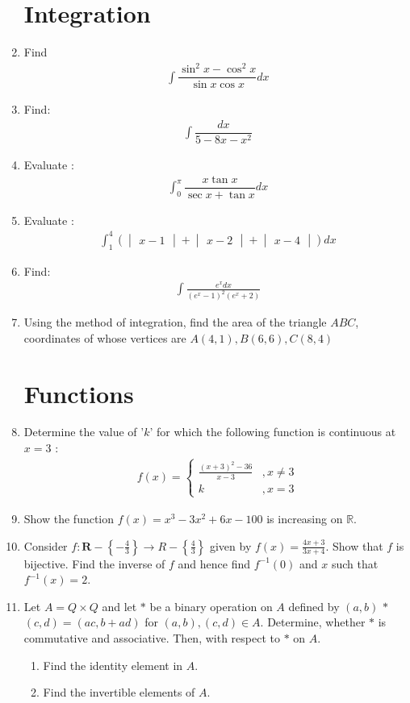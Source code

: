 \documentclass[10pt,-letter paper]{article}
\let\vec\mathbf{}
\let\vec\mathbf{}
\let\vec\mathbf{}
\providecommand{\cbrak}[1]{\ensuremath{\left\{#1\right\}}}
\providecommand{\brak}[1]{\ensuremath{\left(#1\right)}}
\newcommand{\mydet}[1]{\ensuremath{\begin{vmatrix}#1\end{vmatrix}}}
\providecommand{\mydet}[1]{\ensuremath{\begin{vmatrix}#1\end{vmatrix}}}
\begin{document}
\begin{enumerate}
\section{Integration}
\item Find
\begin{align*} 
\int \dfrac{{\sin}^{2} x-{\cos}^{2} x}{\sin x\cos x}dx
\end{align*}
\item Find:
\begin{align*} 
\int\dfrac{dx}{5-8{x}-{x}^{2}}
\end{align*}
\item Evaluate :	
\begin{align*}
\int_{0}^{\pi} \dfrac{x\tan x}{\sec x+\tan x}dx 
\end{align*}
\item Evaluate :
\begin{align*}
\int_{1}^{4}\brak{\mydet{x-1}+\mydet{x-2}+\mydet{x-4}}dx
\end{align*}
\item Find:
\begin{align*}
\int \frac{{e}^{x}dx}{{{\brak{{{e}^{x}-1}}^{2}}{\brak{{e}^{x}+2}}}}
\end{align*}
\item Using the method of integration, find the area of the triangle $ABC$, coordinates of whose vertices are $A\brak{4,1}, B\brak{6,6}, C\brak{8,4}$
\section{Functions}
\item Determine the value of '$k$' for which the following function is continuous at $x=3$ :
\begin{align*}
f\brak{x}=\left\{\begin{array}{cc}
\frac{(x+3)^2-36}{x-3} & , x \neq 3 \\k & , x=3
\end{array}\right.  
\end{align*}
\item Show the function $f\brak{x} = {x}^{3} -3{x}^{2}+6x-100$ is increasing on $\mathbb{R}$.
\item Consider $f:\vec{R}-\cbrak{{-\frac{4}{3}}} \rightarrow R-\cbrak{\frac{4}{3}}$ given by $f\brak{x}=\frac{4x+3}{3x+4}$. Show that $f$ is bijective. Find the inverse of $f$ and hence find ${f}^{-1}\brak{0}$ and $x$ such that ${f}^{-1}\brak{x}=2$.
\item Let $A = {Q}\times{Q}$ and let $\ast$ be  a binary operation on $A$ defined by $\brak{a, b}$  $\ast$  $\brak {c, d} = \brak{{a}{c}, b+{a}{d}}$ for $\brak{a, b}, \brak {c, d} \in A$. Determine, whether $\ast$ is commutative and associative. Then, with respect to $\ast$ on $A$.
\begin{enumerate}[label = (\roman*)]
\item Find the identity element in $A$.
\item Find the invertible elements of $A$.
\end{enumerate}

\end{enumerate}
\end{document}
